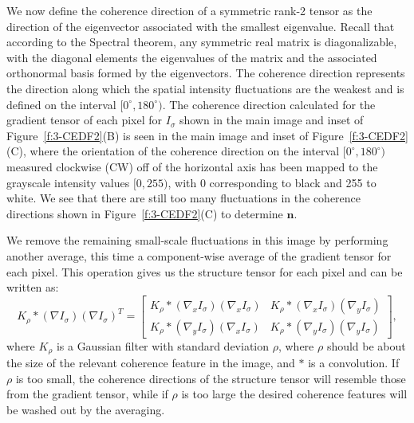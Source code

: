 We now define the coherence direction of a symmetric rank-2 tensor as the direction of the eigenvector associated with the smallest eigenvalue.
Recall that according to the Spectral theorem, any symmetric real matrix is diagonalizable, with the diagonal elements the eigenvalues of the matrix and the associated orthonormal basis formed by the eigenvectors.
The coherence direction represents the direction along which the spatial intensity fluctuations are the weakest and is defined on the interval $[0^{\circ}, 180^{\circ})$.
The coherence direction calculated for the gradient tensor of each pixel for $I_\sigma$ shown in the main image and inset of Figure~\ref{f:3-CEDF2}(B) is seen in the main image and inset of Figure~\ref{f:3-CEDF2}(C), where the orientation of the coherence direction on the interval $[0^{\circ}, 180^{\circ})$ measured clockwise (CW) off of the horizontal axis has been mapped to the grayscale intensity values $[0,255)$, with 0 corresponding to black and 255 to white.
We see that there are still too many fluctuations in the coherence directions shown in Figure~\ref{f:3-CEDF2}(C) to determine $\mathbf{n}$.

We remove the remaining small-scale fluctuations in this image by performing another average, this time a component-wise average of the gradient tensor for each pixel.
This operation gives us the structure tensor for each pixel and can be written as:
\begin{equation}
K_{\rho} \ast (\nabla I_{\sigma})(\nabla I_{\sigma})^T =
\begin{bmatrix}
K_{\rho} \ast ( \nabla_x I_{\sigma})(\nabla_x I_{\sigma}) & K_{\rho} \ast (\nabla_x I_{\sigma})(\nabla_y I_{\sigma}) \\
K_{\rho} \ast (  \nabla_y I_{\sigma})(\nabla_x I_{\sigma}) & K_{\rho} \ast (\nabla_y I_{\sigma})(\nabla_y I_{\sigma})
\end{bmatrix},
\end{equation}
where $K_{\rho}$ is a Gaussian filter with standard deviation $\rho$, where $\rho$ should be about the size of the relevant coherence feature in the image, and $\ast$ is a convolution.
If $\rho$ is too small, the coherence directions of the structure tensor will resemble those from the gradient tensor, while if $\rho$ is too large the desired coherence features will be washed out by the averaging.

